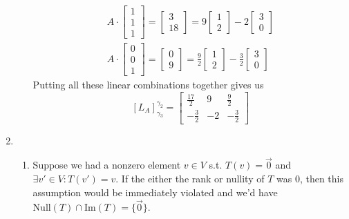 \documentclass[12pt]{article}
\begin{document}
\begin{enumerate}
\begin{enumerate}
\begin{gather*}
                              A \cdot \begin{bmatrix}1 \\ 1 \\ 1\end{bmatrix} = \begin{bmatrix}3 \\ 18\end{bmatrix} = 9\begin{bmatrix}1 \\ 2\end{bmatrix}-2\begin{bmatrix}3 \\ 0\end{bmatrix} \\
                              A \cdot \begin{bmatrix}0 \\ 0 \\ 1\end{bmatrix} = \begin{bmatrix}0 \\ 9\end{bmatrix} = \frac{9}{2}\begin{bmatrix}1 \\ 2\end{bmatrix}-\frac{3}{2}\begin{bmatrix}3 \\ 0\end{bmatrix}
                        \end{gather*}
                        Putting all these linear combinations together gives us
                        \[[L_A]^{\gamma_2}_{\gamma_3}=\begin{bmatrix}
                                    \frac{17}{2} & 9  & \frac{9}{2}  \\
                                    -\frac{3}{2} & -2 & -\frac{3}{2}
                              \end{bmatrix}\]
            \end{enumerate}
      \item \begin{enumerate}
                  \item Suppose we had a nonzero element $v \in V$ s.t. $T(v)=\vec{0}$ and $\exists v' \in V: T(v')=v$.
                        If the either the rank or nullity of $T$ was $0$, then this assumption would be immediately
                        violated and we'd have $\text{Null}(T) \cap \text{Im}(T)=\{\vec{0}\}$.


\end{enumerate}
\end{enumerate}
\end{document}
